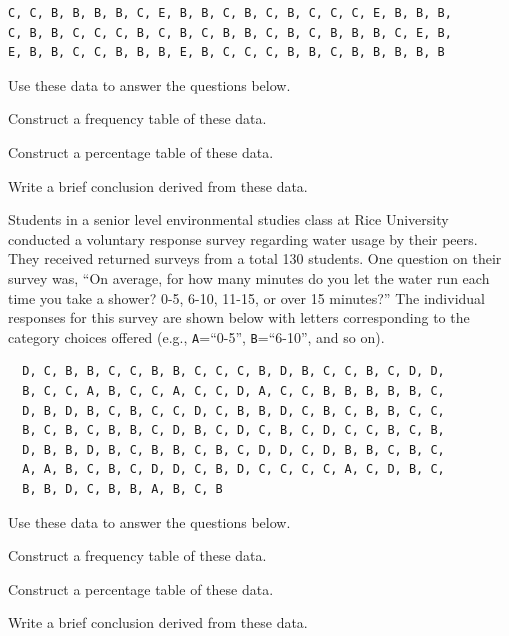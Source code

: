 \documentclass[10pt,openany]{book}\usepackage[]{graphicx}\usepackage[]{color}
\begin{document}
\begin{exsection}
  \begin{Verbatim}
C, C, B, B, B, B, C, E, B, B, C, B, C, B, C, C, C, E, B, B, B,
C, B, B, C, C, C, B, C, B, C, B, B, C, B, C, B, B, B, C, E, B,
E, B, B, C, C, B, B, B, E, B, C, C, C, B, B, C, B, B, B, B, B
  \end{Verbatim}

  Use these data to answer the questions below. 
  \begin{Enumerate}
    \item Construct a frequency table of these data.
    \item Construct a percentage table of these data.
    \item Write a brief conclusion derived from these data.
  \end{Enumerate}

  \item \label{revex:cuEDARice} \rhw{} Students in a senior level environmental studies class at Rice University conducted a voluntary response survey regarding water usage by their peers.  They received returned surveys from a total 130 students.  One question on their survey was, ``On average, for how many minutes do you let the water run each time you take a shower? 0-5, 6-10, 11-15, or over 15 minutes?''  The individual responses for this survey are shown below with letters corresponding to the category choices offered (e.g., \verb"A"=``0-5'', \verb"B"=``6-10'', and so on). 

  \begin{Verbatim}
  D, C, B, B, C, C, B, B, C, C, C, B, D, B, C, C, B, C, D, D,
  B, C, C, A, B, C, C, A, C, C, D, A, C, C, B, B, B, B, B, C,
  D, B, D, B, C, B, C, C, D, C, B, B, D, C, B, C, B, B, C, C,
  B, C, B, C, B, B, C, D, B, C, D, C, B, C, D, C, C, B, C, B,
  D, B, B, D, B, C, B, B, C, B, C, D, D, C, D, B, B, C, B, C,
  A, A, B, C, B, C, D, D, C, B, D, C, C, C, C, A, C, D, B, C,
  B, B, D, C, B, B, A, B, C, B
  \end{Verbatim}

  Use these data to answer the questions below.
  \begin{Enumerate}
    \item Construct a frequency table of these data.
    \item Construct a percentage table of these data.
    \item Write a brief conclusion derived from these data.
  \end{Enumerate}
\end{exsection}
\end{document}
